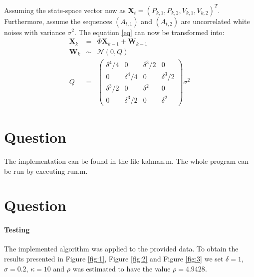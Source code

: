 \documentclass[a4paper, 12pt, titlepage]{article}
\begin{document}
Assuming the state-space vector now as $\pmb{X}_t=(P_{k,1},P_{k,2},V_{k,1},V_{k,2})^T$.
Furthermore, assume the sequences $(A_{t,1})$ and $(A_{t,2})$ are uncorrelated white noises with variance $\sigma^2$.
The equation \eqref{eq} can now be transformed into: %
\begin{eqnarray}
	\pmb{X}_{k} &=& \Phi \pmb{X}_{k-1} + \pmb{W}_{k-1}\\
	\pmb{W}_{k} &\sim& \mathcal{N}(0,Q)\\
	Q&=& \left(
		\begin{array}{cccc}
		\delta^4/4& 0& \delta^3/2 & 0\\
		0 & \delta^4/4 & 0& \delta^3/2\\
		\delta^3/2 & 0& \delta^2 &0\\
		0 & \delta^3/2 & 0 & \delta^2
		\end{array}
	\right)\sigma^2
\end{eqnarray}

\section{Question}

The implementation can be found in the file kalman.m.
The whole program can be run by executing run.m.

\section{Question}

\paragraph{Testing}

The implemented algorithm was applied to the provided data. To obtain the results presented in Figure \ref{fig:1}, Figure \ref{fig:2} and Figure \ref{fig:3} we set $\delta=1$, $\sigma=0.2$, $\kappa=10$ and $\rho$ was estimated to have the value $\rho=4.9428$.
\end{document}
